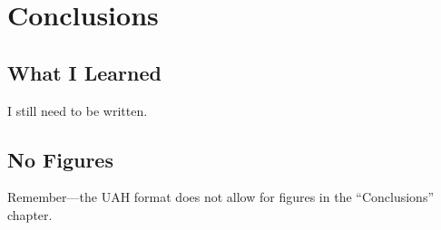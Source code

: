\chapter{Conclusions}
\label{ch:thisChapterLabel}

\section{What I Learned}

I still need to be written.

\section{No Figures}

Remember---the UAH format does not allow for figures in the
``Conclusions'' chapter.

